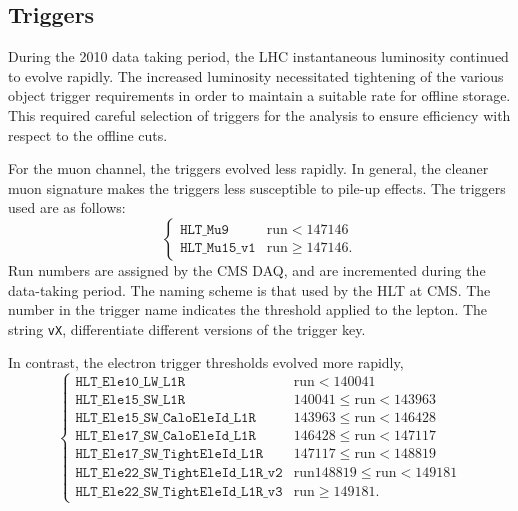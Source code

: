 

\subsection{Triggers}
\label{sec:wpol_triggers}
During the 2010 data taking period, the \ac{LHC} instantaneous luminosity
continued to evolve rapidly. The increased luminosity necessitated tightening of
the various object trigger requirements in order to maintain a suitable rate for
offline storage. This required careful selection of triggers for the analysis to
ensure efficiency with respect to the offline cuts.

For the muon channel, the triggers evolved less rapidly. In general, the cleaner
muon signature makes the triggers less susceptible to pile-up effects. The
triggers used are as follows:
\begin{equation*}
\begin{cases}
\texttt{HLT\_Mu9}          & \textrm{run} < 147146 \\
\texttt{HLT\_Mu15\_v1} & \textrm{run} \geq 147146.
\end{cases}
\end{equation*}
Run numbers are assigned by the \ac{CMS} \ac{DAQ}, and are incremented during
the data-taking period. The naming scheme is that used by the \ac{HLT} at
\ac{CMS}. The number in the trigger name indicates the \Pt threshold applied to
the lepton. The string \texttt{vX}, differentiate different versions of the
trigger key.

In contrast, the electron trigger thresholds evolved more rapidly,
\begin{equation*}
\begin{cases}
  \texttt{HLT\_Ele10\_LW\_L1R} & \textrm{run} < 140041 \\
  \texttt{HLT\_Ele15\_SW\_L1R} & 140041 \leq \textrm{run} < 143963 \\
  \texttt{HLT\_Ele15\_SW\_CaloEleId\_L1R} & 143963 \leq \textrm{run} < 146428 \\
  \texttt{HLT\_Ele17\_SW\_CaloEleId\_L1R} & 146428 \leq \textrm{run} < 147117 \\
  \texttt{HLT\_Ele17\_SW\_TightEleId\_L1R} & 147117 \leq \textrm{run} < 148819 \\
  \texttt{HLT\_Ele22\_SW\_TightEleId\_L1R\_v2} & \textrm{run} 148819 \leq \textrm{run} < 149181 \\
  \texttt{HLT\_Ele22\_SW\_TightEleId\_L1R\_v3} & \textrm{run} \geq 149181.
\end{cases}
\end{equation*}

